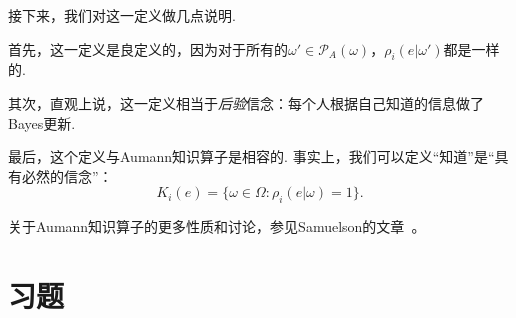 接下来，我们对这一定义做几点说明. 

首先，这一定义是良定义的，因为对于所有的$\omega'\in\mathcal P_A(\omega)$，$\rho_i(e|\omega')$都是一样的.

其次，直观上说，这一定义相当于\textit{后验}信念：每个人根据自己知道的信息做了Bayes更新.

最后，这个定义与Aumann知识算子是相容的. 事实上，我们可以定义“知道”是“具有必然的信念”：
\[K_i(e)=\{\omega\in\Omega:\rho_i(e|\omega) = 1\}.\]

\begin{remark}
    关于Aumann知识算子的更多性质和讨论，参见Samuelson的文章~\cite{samuelsonModelingKnowledgeEconomic2004}。
\end{remark}

\section{习题}

